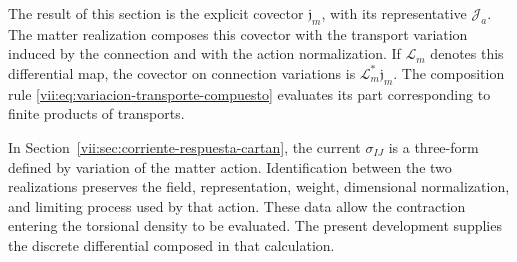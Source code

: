 The result of this section is the explicit covector
\(\mathfrak j_m\), with its representative \(\mathcal J_a\).
The matter realization composes this covector with the transport
variation induced by the connection and with the action normalization.
If \(\mathcal L_m\) denotes this differential map, the covector on
connection variations is \(\mathcal L_m^*\mathfrak j_m\).
The composition rule
\eqref{vii:eq:variacion-transporte-compuesto} evaluates its part
corresponding to finite products of transports.

In Section~\ref{vii:sec:corriente-respuesta-cartan}, the current
\(\sigma_{IJ}\) is a three-form defined by variation of the matter
action. Identification between the two realizations preserves the field,
representation, weight, dimensional normalization, and limiting process
used by that action. These data allow the contraction entering
the torsional density to be evaluated. The present development
supplies the discrete differential composed in that calculation.
